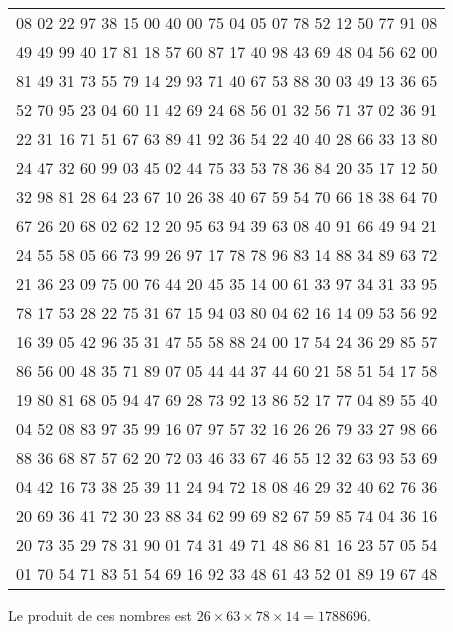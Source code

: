 \begin{center}
    \begin{tabular}{c}
        08 02 22 97 38 15 00 40 00 75 04 05 07 78 52 12 50 77 91 08\\
        49 49 99 40 17 81 18 57 60 87 17 40 98 43 69 48 04 56 62 00\\
        81 49 31 73 55 79 14 29 93 71 40 67 53 88 30 03 49 13 36 65\\
        52 70 95 23 04 60 11 42 69 24 68 56 01 32 56 71 37 02 36 91\\
        22 31 16 71 51 67 63 89 41 92 36 54 22 40 40 28 66 33 13 80\\
        24 47 32 60 99 03 45 02 44 75 33 53 78 36 84 20 35 17 12 50\\
        32 98 81 28 64 23 67 10 \textcolor[rgb]{1,0,0}{26} 38 40 67 59 54 70 66 18 38 64 70\\
        67 26 20 68 02 62 12 20 95 \textcolor[rgb]{1,0,0}{63} 94 39 63 08 40 91 66 49 94 21\\
        24 55 58 05 66 73 99 26 97 17 \textcolor[rgb]{1,0,0}{78} 78 96 83 14 88 34 89 63 72\\
        21 36 23 09 75 00 76 44 20 45 35 \textcolor[rgb]{1,0,0}{14} 00 61 33 97 34 31 33 95\\
        78 17 53 28 22 75 31 67 15 94 03 80 04 62 16 14 09 53 56 92\\
        16 39 05 42 96 35 31 47 55 58 88 24 00 17 54 24 36 29 85 57\\
        86 56 00 48 35 71 89 07 05 44 44 37 44 60 21 58 51 54 17 58\\
        19 80 81 68 05 94 47 69 28 73 92 13 86 52 17 77 04 89 55 40\\
        04 52 08 83 97 35 99 16 07 97 57 32 16 26 26 79 33 27 98 66\\
        88 36 68 87 57 62 20 72 03 46 33 67 46 55 12 32 63 93 53 69\\
        04 42 16 73 38 25 39 11 24 94 72 18 08 46 29 32 40 62 76 36\\
        20 69 36 41 72 30 23 88 34 62 99 69 82 67 59 85 74 04 36 16\\
        20 73 35 29 78 31 90 01 74 31 49 71 48 86 81 16 23 57 05 54\\
        01 70 54 71 83 51 54 69 16 92 33 48 61 43 52 01 89 19 67 48\\
    \end{tabular}
\end{center}

Le produit de ces nombres est $26 \times 63 \times 78 \times 14 = 1788696$.

